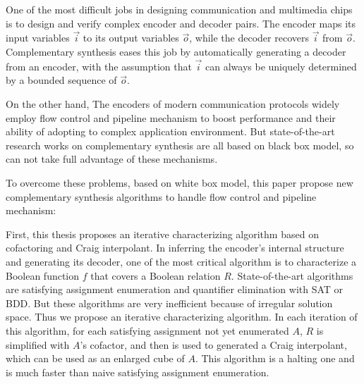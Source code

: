 \begin{eabstract}
One of the most difficult jobs in designing communication
and multimedia chips is to design and verify complex encoder and decoder pairs.
The encoder maps its input variables $\vec{i}$ to its output variables $\vec{o}$,
while the decoder recovers $\vec{i}$ from $\vec{o}$.
Complementary synthesis
eases this job by
automatically generating a decoder from an encoder,
with the assumption that $\vec{i}$ can always be
uniquely determined by a bounded sequence of $\vec{o}$.

On the other hand,
The encoders of modern communication protocols
widely employ flow control and pipeline mechanism to boost performance and their ability of adopting to complex application environment.
But state-of-the-art research works on complementary synthesis
are all based on black box model,
so can not take full advantage of these mechanisms.

To overcome these problems,
based on white box model,
this paper propose new complementary synthesis algorithms to handle flow control and pipeline mechanism:

First,
this thesis proposes an iterative characterizing algorithm based on cofactoring and Craig interpolant.
In inferring the encoder's internal structure and generating its decoder,
one of the most critical algorithm is to characterize a Boolean function $f$
that covers a Boolean relation $R$.
State-of-the-art algorithms are satisfying assignment enumeration and quantifier elimination with SAT or BDD.
But these algorithms are very inefficient because of irregular solution space.
Thus we propose an iterative characterizing algorithm.
In each iteration of this algorithm,
for each satisfying assignment not yet enumerated $A$,
$R$ is simplified with $A$'s cofactor,
and then is used to generated a Craig interpolant,
which can be used as an enlarged cube of $A$.
This algorithm is a halting one and is much faster than naive satisfying assignment enumeration.


\end{eabstract}
